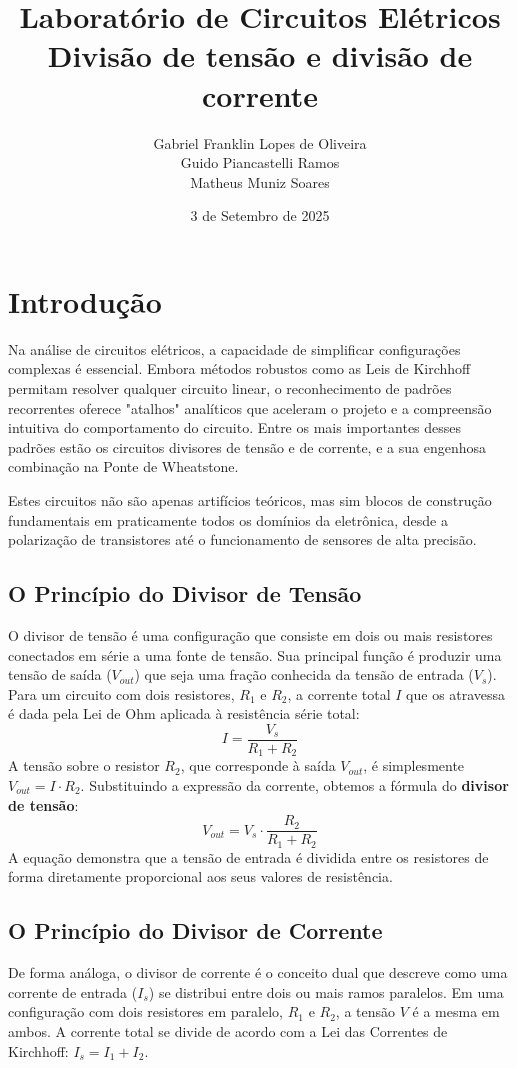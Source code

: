 \documentclass[a4paper, 12pt]{article}
\title{Laboratório de Circuitos Elétricos \\ Divisão de tensão e divisão de corrente}
\author{Gabriel Franklin Lopes de Oliveira \\
Guido Piancastelli Ramos \\
Matheus Muniz Soares
}
\date{3 de Setembro de 2025}
\begin{document}
\maketitle

\section{Introdução}

Na análise de circuitos elétricos, a capacidade de simplificar configurações complexas é essencial. Embora métodos robustos como as Leis de Kirchhoff permitam resolver qualquer circuito linear, o reconhecimento de padrões recorrentes oferece "atalhos" analíticos que aceleram o projeto e a compreensão intuitiva do comportamento do circuito. Entre os mais importantes desses padrões estão os circuitos divisores de tensão e de corrente, e a sua engenhosa combinação na Ponte de Wheatstone.

Estes circuitos não são apenas artifícios teóricos, mas sim blocos de construção fundamentais em praticamente todos os domínios da eletrônica, desde a polarização de transistores até o funcionamento de sensores de alta precisão.

\subsection{O Princípio do Divisor de Tensão}
O divisor de tensão é uma configuração que consiste em dois ou mais resistores conectados em série a uma fonte de tensão. Sua principal função é produzir uma tensão de saída ($V_{out}$) que seja uma fração conhecida da tensão de entrada ($V_s$). Para um circuito com dois resistores, $R_1$ e $R_2$, a corrente total $I$ que os atravessa é dada pela Lei de Ohm aplicada à resistência série total:
\[
I = \frac{V_s}{R_1 + R_2}
\]
A tensão sobre o resistor $R_2$, que corresponde à saída $V_{out}$, é simplesmente $V_{out} = I \cdot R_2$. Substituindo a expressão da corrente, obtemos a fórmula do \textbf{divisor de tensão}:
\begin{equation}
V_{out} = V_s \cdot \frac{R_2}{R_1 + R_2}
\label{eq:divisor_tensao}
\end{equation}
A equação demonstra que a tensão de entrada é dividida entre os resistores de forma diretamente proporcional aos seus valores de resistência.

\subsection{O Princípio do Divisor de Corrente}
De forma análoga, o divisor de corrente é o conceito dual que descreve como uma corrente de entrada ($I_s$) se distribui entre dois ou mais ramos paralelos. Em uma configuração com dois resistores em paralelo, $R_1$ e $R_2$, a tensão $V$ é a mesma em ambos. A corrente total se divide de acordo com a Lei das Correntes de Kirchhoff: $I_s = I_1 + I_2$.
\end{document}
